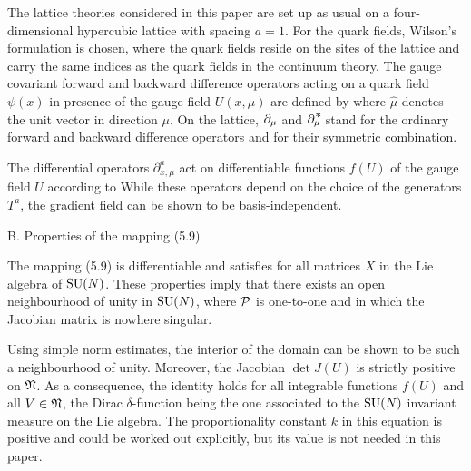 The lattice theories considered in this paper are 
set up as usual on a four-dimen\-sional hypercubic 
lattice with spacing $a=1$. 
For the quark fields, Wilson's formulation is chosen,
where the quark fields reside on the sites of the lattice
and carry the same indices as the quark fields in the 
continuum theory.
The gauge covariant forward and backward difference operators
acting on a quark field $\psi(x)$ in presence of 
the gauge field $U(x,\mu)$ are defined by
where $\hat{\mu}$ denotes the unit vector in direction $\mu$.
On the lattice, ${\partial_{\mu}}$ and $\drvstar{\mu}$ stand for
the ordinary forward and backward difference operators 
and
for their symmetric combination.

The differential operators $\partial^a_{x,\mu}$ act on 
differentiable functions $f(U)$ of the gauge field $U$ according to
While these operators depend on the choice of the generators $T^a$,
the gradient field
can be shown to be basis-independent.



\lusapp B. Properties of the mapping (5.9)

The mapping (5.9) is differentiable and satisfies
for all matrices $X$ in the Lie algebra of ${\rm SU}(N)$. 
These properties imply that
there exists an open neighbourhood of unity in ${\rm SU}(N)$,
where ${\cal P}$ is one-to-one and in which
the Jacobian matrix
is nowhere singular.

Using simple norm estimates, 
the interior of the domain
can be shown to be such a neighbourhood of unity. Moreover,
the Jacobian $\det J(U)$ is strictly positive 
on $\mathfrak{N}$.
As a consequence, the identity
holds for all integrable functions $f(U)$
and all $V\in\mathfrak{N}$, the Dirac $\delta$-function being the 
one associated to the ${\rm SU}(N)$ invariant measure 
on the Lie algebra.
The proportionality 
constant $k$ in this equation is positive and could be worked out
explicitly, but its value is not needed in this paper.



